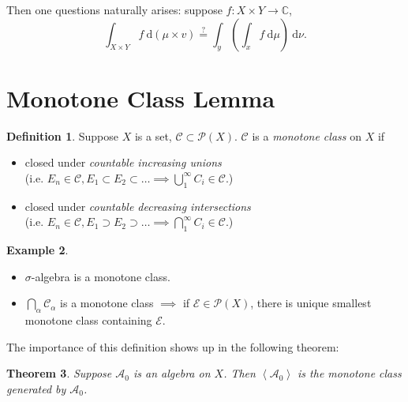 \documentclass{report}
\newcommand{\C}{\mathbb{C}}
\newcommand{\cA}{\mathcal{A}}
\newcommand{\df}{\ \mathrm{d}}
\newcommand{\gen}[1]{\left\langle #1 \right\rangle}
\newtheorem{theorem}{Theorem}[chapter]
\theoremstyle{definition}
\newtheorem{definition}[theorem]{Definition}
\newtheorem{example}[theorem]{Example}
\theoremstyle{remark}
\begin{document}
Then one questions naturally arises: suppose $f: X \times Y \to \C$, \[\int_{X \times Y} f \df(\mu \times v) \stackrel{\text{?}}{=} \int_y \left(\int_x f \df \mu\right) \df \nu.\]

\section{Monotone Class Lemma}
\begin{definition}
	Suppose $X$ is a set, $\mathcal{C} \subset \mathcal{P}(X)$. $\mathcal{C}$ is a \emph{monotone class} on $X$ if 
	\begin{itemize}
		\item closed under \emph{countable increasing unions} \\
		(i.e. $E_n \in \mathcal{C}, E_1 \subset E_2 \subset \ldots \implies \bigcup_1^\infty C_i \in \mathcal{C}$.)
		\item closed under \emph{countable decreasing intersections} \\
		(i.e. $E_n \in \mathcal{C}, E_1 \supset E_2 \supset \ldots \implies \bigcap_1^\infty C_i \in \mathcal{C}$.)
	\end{itemize}
\end{definition}

\begin{example}
	\begin{itemize}
		\item $\sigma$-algebra is a monotone class.
		\item $\displaystyle \bigcap_\alpha \mathcal{C}_\alpha$ is a monotone class $\implies$ if $\mathcal{E} \in \mathcal{P}(X)$, there is unique smallest monotone class containing $\mathcal{E}$.
	\end{itemize}
\end{example}

The importance of this definition shows up in the following theorem:
\begin{theorem}
	Suppose $\mathcal{A}_0$ is an \emph{algebra} on $X$. Then $\gen{\cA_0}$ is the monotone class generated by $\cA_0$.
\end{theorem}
\end{document}
